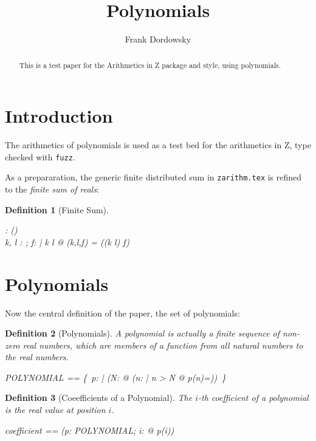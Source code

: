 \documentclass[12pt]{scrartcl}
\newtheorem{zdef}{Definition}[section]
\begin{document}
\title{Polynomials}
\author{Frank Dordowsky}

\maketitle

\begin{abstract}
  This is a test paper for the Arithmetics in Z package and style,
  using polynomials.
\end{abstract}


\section{Introduction}
\label{sec:intro}
The arithmetics of polynomials is used as a test bed for the
arithmetics in Z, type checked with \texttt{fuzz}.

As a prepararation, the generic finite distributed sum in
\texttt{zarithm.tex} is refined to the \emph{finite sum of reals}:
\newcommand{\finsum}{\sum}
\begin{zdef}[Finite Sum]
  \label{zdef:finite-sum}
  
  \begin{axdef}
    \finsum : \nat \cross \nat \cross (\nat \fun \arithmos) \fun \arithmos \\
    \where
    \forall k, l : \nat; f: \nat \fun \arithmos | k \leq l @
    \finsum(k,l,f) = \findistsum((k \upto l) \dres f)
  \end{axdef}
\end{zdef}

\section{Polynomials}
\label{sec:polynomials}
Now the central definition of the paper, the set of polynomials:
\begin{zdef}[Polynomials]
  \label{zdef:polynomials}
  A polynomial is actually a finite sequence of non-zero real numbers,
  which are members of a function from all natural numbers to the real
  numbers.
  \begin{zed}
    POLYNOMIAL == \{~p: \nat \fun \arithmos | (\exists N: \nat @ (\forall n:
    \nat | n > N @ p(n)=\azero))~\}
  \end{zed}
\end{zdef}

\begin{zdef}[Coeefficients of a Polynomial]
  \label{zdef:coefficient}
  The $i$-th coefficient of a polynomial is the real value at position
  $i$. 
  \begin{zed}
    coefficient == (\lambda p: POLYNOMIAL; i: \nat @ p(i))
  \end{zed}
\end{zdef}
\end{document}
